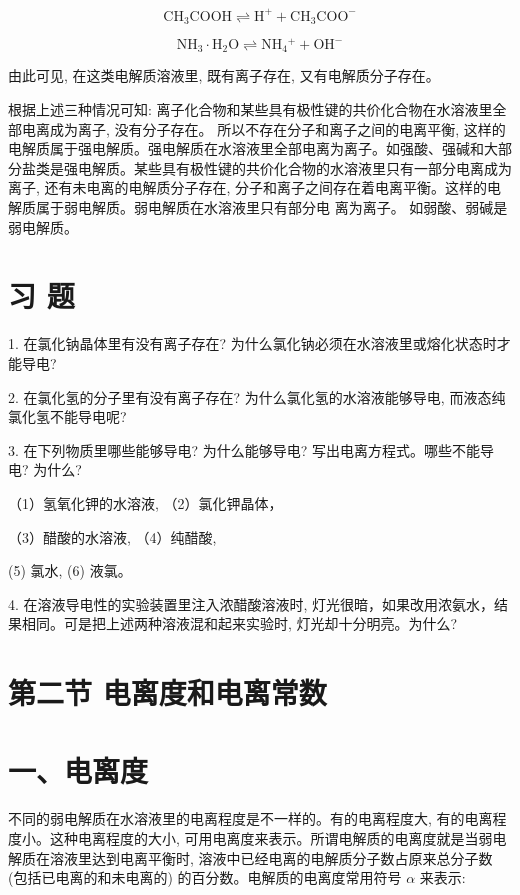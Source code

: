 \documentclass[10pt]{article}
\begin{document}
\[
{\mathrm{{CH}}}_{3}\mathrm{{COOH}} \rightleftharpoons {\mathrm{H}}^{ + } + {\mathrm{{CH}}}_{3}{\mathrm{{COO}}}^{ - }
\]

\[
{\mathrm{{NH}}}_{3} \cdot {\mathrm{H}}_{2}\mathrm{O} \rightleftharpoons {\mathrm{{NH}}}_{4}{}^{ + } + {\mathrm{{OH}}}^{ - }
\]

由此可见, 在这类电解质溶液里, 既有离子存在, 又有电解质分子存在。

根据上述三种情况可知: 离子化合物和某些具有极性键的共价化合物在水溶液里全部电离成为离子, 没有分子存在。 所以不存在分子和离子之间的电离平衡, 这样的电解质属于强电解质。强电解质在水溶液里全部电离为离子。如强酸、强碱和大部分盐类是强电解质。某些具有极性键的共价化合物的水溶液里只有一部分电离成为离子, 还有未电离的电解质分子存在, 分子和离子之间存在着电离平衡。这样的电解质属于弱电解质。弱电解质在水溶液里只有部分电 离为离子。 如弱酸、弱碱是弱电解质。

\section*{习 题}

1. 在氯化钠晶体里有没有离子存在? 为什么氯化钠必须在水溶液里或熔化状态时才能导电?

2. 在氯化氢的分子里有没有离子存在? 为什么氯化氢的水溶液能够导电, 而液态纯氯化氢不能导电呢?

3. 在下列物质里哪些能够导电? 为什么能够导电? 写出电离方程式。哪些不能导电? 为什么?

（1）氢氧化钾的水溶液, （2）氯化钾晶体，

（3）醋酸的水溶液, （4）纯醋酸,

(5) 氯水, (6) 液氯。

4. 在溶液导电性的实验装置里注入浓醋酸溶液时, 灯光很暗，如果改用浓氨水，结果相同。可是把上述两种溶液混和起来实验时, 灯光却十分明亮。为什么?

\section*{第二节 电离度和电离常数}

\section*{一、电离度}

不同的弱电解质在水溶液里的电离程度是不一样的。有的电离程度大, 有的电离程度小。这种电离程度的大小, 可用电离度来表示。所谓电解质的电离度就是当弱电解质在溶液里达到电离平衡时, 溶液中已经电离的电解质分子数占原来总分子数 (包括已电离的和未电离的) 的百分数。电解质的电离度常用符号 \(\alpha\) 来表示:
\end{document}
